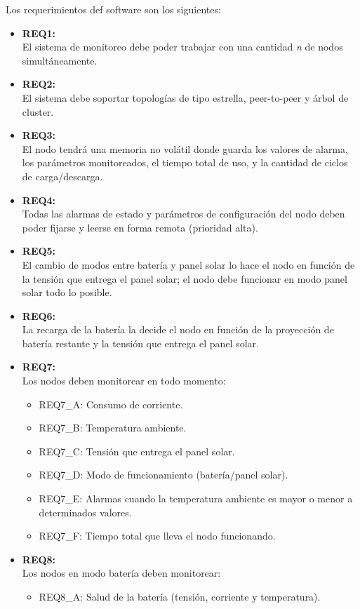 \noindent Los requerimientos def software son los siguientes:
\begin{itemize}
	\item \textbf{REQ1:}\\ El sistema de monitoreo debe poder trabajar con una cantidad \textit{n} de nodos simultáneamente.
	\item \textbf{REQ2:}\\ El sistema debe soportar topologías de tipo estrella, peer-to-peer y árbol de cluster.
	\item \textbf{REQ3:}\\ El nodo tendrá una memoria no volátil donde guarda los valores de alarma, los parámetros monitoreados, el tiempo total de uso, y la cantidad de ciclos de carga/descarga.
	\item \textbf{REQ4:}\\ Todas las alarmas de estado y parámetros de configuración del nodo deben poder fijarse y leerse en forma remota (prioridad alta).	
	\item \textbf{REQ5:}\\ El cambio de modos entre batería y panel solar lo hace el nodo en función de la tensión que entrega el panel solar; el nodo debe funcionar en modo panel solar todo lo posible.
	\item \textbf{REQ6:}\\ La recarga de la batería la decide el nodo en función de la proyección de batería restante y la tensión que entrega el panel solar.	
	\item \textbf{REQ7:}\\ Los nodos deben monitorear en todo momento:	
	\begin{itemize}
		\item REQ7\_A: Consumo de corriente.
		\item REQ7\_B: Temperatura ambiente.
		\item REQ7\_C: Tensión que entrega el panel solar.
		\item REQ7\_D: Modo de funcionamiento (batería/panel solar).
		\item REQ7\_E: Alarmas cuando la temperatura ambiente es mayor o menor a determinados valores.
		\item REQ7\_F: Tiempo total que lleva el nodo funcionando.
		\end{itemize}
	\item \textbf{REQ8:}\\Los nodos en modo batería deben monitorear:
		\begin{itemize}
		\item REQ8\_A: Salud de la batería (tensión, corriente y temperatura).

\end{itemize}
\end{itemize}
